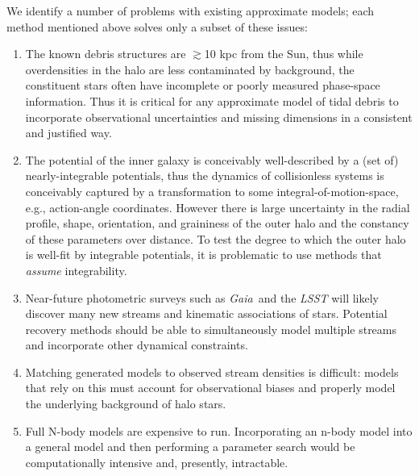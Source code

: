 \documentclass[letterpaper,12pt,preprint]{aastex}
\newcommand{\project}[1]{\textsl{#1}}
\newcommand{\gaia}{\project{Gaia}}
\begin{document}
We identify a number of problems with existing approximate models; each method mentioned above solves only a subset of these issues:
\begin{enumerate}
	\item The known debris structures are $\gtrsim$10 kpc from the Sun, thus while overdensities in the halo are less contaminated by background, the constituent stars often have incomplete or poorly measured phase-space information. Thus it is critical for any approximate model of tidal debris to incorporate observational uncertainties and missing dimensions in a consistent and justified way. 
	\item The potential of the inner galaxy is conceivably well-described by a (set of) nearly-integrable potentials, thus the dynamics of collisionless systems is conceivably captured by a transformation to some integral-of-motion-space, e.g., action-angle coordinates. However there is large uncertainty in the radial profile, shape, orientation, and graininess of the outer halo and the constancy of these parameters over distance. To test the degree to which the outer halo is well-fit by integrable potentials, it is problematic to use methods that \emph{assume} integrability. 
	\item Near-future photometric surveys such as \gaia\, and the \project{LSST} will likely discover many new streams and kinematic associations of stars. Potential recovery methods should be able to simultaneously model multiple streams and incorporate other dynamical constraints.
	\item Matching generated models to observed stream densities is difficult: models that rely on this must account for observational biases and properly model the underlying background of halo stars. 
	\item Full N-body models are expensive to run. Incorporating an n-body model into a general model and then performing a parameter search would be computationally intensive and, presently, intractable. 
\end{enumerate}
\end{document}
